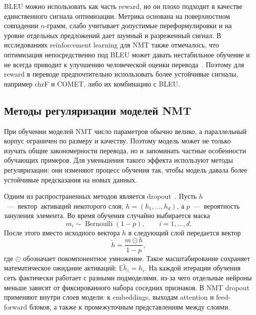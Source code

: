 BLEU можно использовать как часть reward, но он плохо подходит в качестве единственного сигнала оптимизации. Метрика основана на поверхностном совпадении $n$-грамм, слабо учитывает допустимые переформулировки и на уровне отдельных предложений дает шумный и разреженный сигнал. В исследованиях reinforcement learning для NMT также отмечалось, что оптимизация непосредственно под BLEU может давать нестабильное обучение и не всегда приводит к улучшению человеческой оценки перевода~\cite{rl_nmt_bleu_reward}. Поэтому для reward в переводе предпочтительно использовать более устойчивые сигналы, например chrF и COMET, либо их комбинацию с BLEU.

\subsection{Методы регуляризации моделей NMT}

При обучении моделей NMT число параметров обычно велико, а параллельный корпус ограничен по размеру и качеству.
Поэтому модель может не только изучать общие закономерности перевода, но и запоминать частные особенности обучающих примеров.
Для уменьшения такого эффекта используют методы регуляризации: они изменяют процесс обучения так, чтобы модель давала более устойчивые предсказания на новых данных.

Одним из распространенных методов является dropout~\cite{dropout}.
Пусть \mbox{$h$~---~вектор активаций} некоторого слоя, $h = (h_1, \ldots, h_d)$, а \mbox{$p$~---~вероятность} зануления элемента.
Во время обучения случайно выбирается маска
\[
	m_i \sim \operatorname{Bernoulli}(1 - p), \qquad i = 1, \ldots, d.
\]
После этого вместо исходного вектора $h$ в следующий слой передается вектор
\[
	\tilde{h} = \frac{m \odot h}{1 - p},
\]
где $\odot$ обозначает покомпонентное умножение.
Такое масштабирование сохраняет математическое ожидание активаций: $\mathbb{E}\tilde{h}_i = h_i$.
На каждой итерации обучения сеть фактически работает с разными подмоделями, из-за чего отдельные нейроны меньше зависят от фиксированного набора соседних признаков.
В NMT dropout применяют внутри слоев модели: к embeddings, выходам attention и feed-forward блоков, а также к промежуточным представлениям между слоями.

